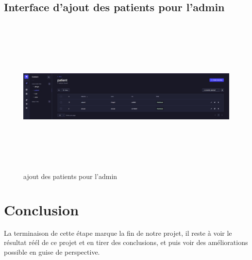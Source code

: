 \subsection{Interface d'ajout des patients pour l'admin}

\newpage

\begin{figure}[!h]
\begin{center}
\includegraphics[height=8cm,width=18cm]{backadmin.jpeg}
\end{center}
\caption{ajout des patients pour l'admin}
\end{figure}




\section{Conclusion}
La terminaison de cette étape marque la fin de notre projet, il reste à voir le résultat réél de ce projet et en tirer des conclusions, et puis voir des améliorations possible en guise de perspective.

